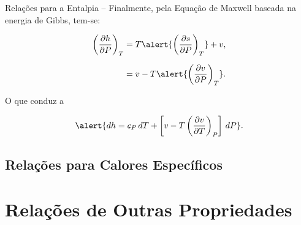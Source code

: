 \begin{frame}[allowframebreaks]{Relações para a Entalpia --}
        \pagebreak
        Finalmente, pela Equação de Maxwell baseada na energia de Gibbs, tem-se:

        \begin{align*}
            \left(\frac{\partial h}{\partial P}\right)_T
            &= T\alert{\left(\frac{\partial s}{\partial P}\right)_T} + v,
            \\[\medskipamount]
            &= v - T\alert{\left(\frac{\partial v}{\partial P}\right)_T}.
        \end{align*}

        O que conduz a

        \begin{equation*}
            \alert{
                dh = c_P\,dT +
                \left[
                    v -
                    T\left(
                        \frac{\partial v}{\partial T}
                    \right)_P
                \right]\,dP
            }.
        \end{equation*}

    \end{frame}

\subsection{Relações para Calores Específicos}

\section{Relações de Outras Propriedades}

